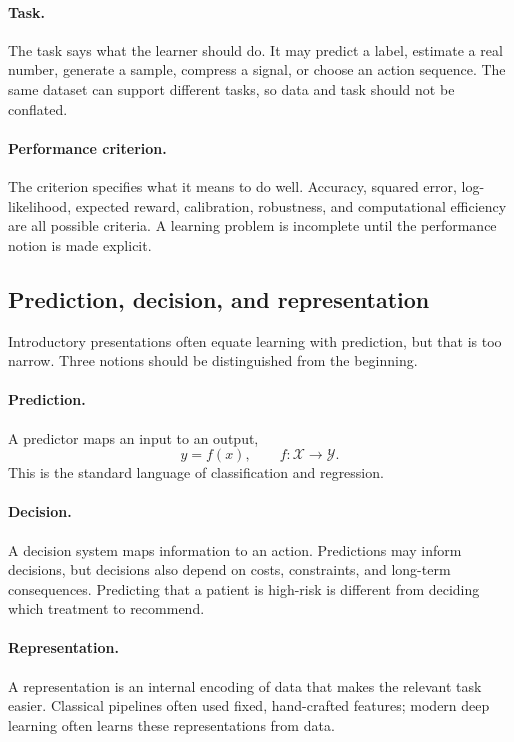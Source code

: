 \paragraph{Task.}
The task says what the learner should do. It may predict a label, estimate a real number, generate a sample, compress a signal, or choose an action sequence. The same dataset can support different tasks, so data and task should not be conflated.

\paragraph{Performance criterion.}
The criterion specifies what it means to do well. Accuracy, squared error, log-likelihood, expected reward, calibration, robustness, and computational efficiency are all possible criteria. A learning problem is incomplete until the performance notion is made explicit.

\subsection*{Prediction, decision, and representation}

Introductory presentations often equate learning with prediction, but that is too narrow. Three notions should be distinguished from the beginning.

\paragraph{Prediction.}
A predictor maps an input to an output,
\[
\hat y = f(x), \qquad f:\mathcal X\to\mathcal Y.
\]
This is the standard language of classification and regression.

\paragraph{Decision.}
A decision system maps information to an action. Predictions may inform decisions, but decisions also depend on costs, constraints, and long-term consequences. Predicting that a patient is high-risk is different from deciding which treatment to recommend.

\paragraph{Representation.}
A representation is an internal encoding of data that makes the relevant task easier. Classical pipelines often used fixed, hand-crafted features; modern deep learning often learns these representations from data.

